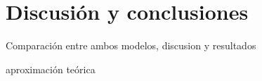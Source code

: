 \chapter{Discusi\'on y conclusiones}
Comparaci\'on entre ambos modelos, discusion y resultados

aproximaci\'on te\'orica

